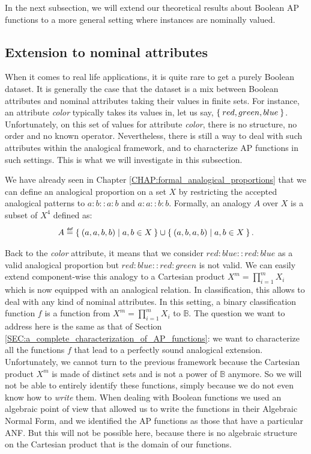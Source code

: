In the next subsection, we will extend our theoretical results about Boolean AP
functions to a more general setting where instances are nominally valued.

\subsection{Extension to nominal attributes}
\label{SEC:extension_to_nominal_attributes}

When it comes to real life applications, it is quite rare to get a purely
Boolean dataset.  It is generally the case that the dataset  is  a mix between
Boolean attributes and nominal attributes taking their values in finite sets.
For instance, an attribute \textit{color} typically takes its values in, let us
say, $\Set{red, green,blue}$. Unfortunately, on this set of values for attribute
\textit{color}, there is no structure, no order and no known operator.
Nevertheless, there is still a way to deal with such attributes within the
analogical framework, and to characterize AP functions in such settings. This
is what we will investigate in this subsection.
 

We have already seen in Chapter \ref{CHAP:formal_analogical_proportions} that we
can define an analogical proportion on a set $X$ by restricting the accepted
analogical patterns to $a:b::a:b$ and $a:a::b:b$.  Formally, an analogy $A$
over $X$ is a subset of $X^4$ defined as:
$$A \eqdef \Set{ (a,a,b,b)  | a, b \in X} \cup \Set{ (a,b,a,b) | a, b \in X}.$$

Back to the \textit{color} attribute, it means that we consider
$red:blue::red:blue$ as a valid analogical proportion but $red:blue::red:green$
is not valid. We can easily extend component-wise this analogy to a Cartesian
product $X^m=\prod_{i=1}^m X_i$ which is now equipped with an analogical
relation. In classification, this allows to deal with any kind of nominal
attributes.  In this setting, a binary classification function $f$ is a
function from $X^m=\prod_{i=1}^m X_i$ to $\mathbb{B}$. The question we want to
address here is the same as that of Section
\ref{SEC:a_complete_characterization_of_AP_functions}: we want to characterize all
the functions $f$ that lead to a perfectly sound analogical extension.
Unfortunately, we cannot turn to the previous framework because the Cartesian
product $X^m$ is made of distinct sets and is not a power of
$\mathbb{B}$ anymore. So we will not be able to entirely identify these functions,
simply because we do not even know how to \textit{write} them. When dealing
with Boolean functions we used an algebraic point of view that allowed us
to write the functions in their Algebraic Normal Form, and we identified the AP
functions as those that have a particular ANF. But this will not be
possible here, because there is no algebraic structure on the Cartesian product that
is the domain of our functions.

